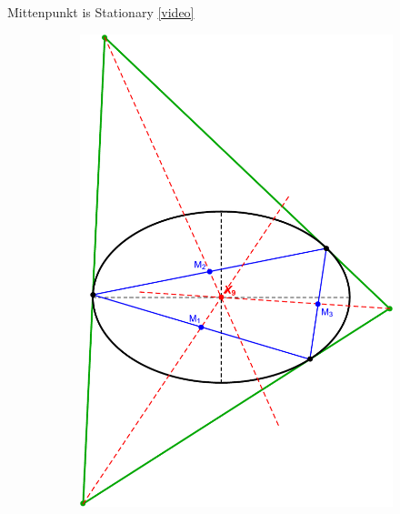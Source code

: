 \begin{frame}{Mittenpunkt is Stationary  \href{https://youtu.be/tMrBqfRBYik}{[video]}}
\begin{figure}
\centering
     \begin{subfigure}[t]{0.45\textwidth}
         \centering
         \includegraphics[height=.8\textheight]{pics/0052_mitten_rot.pdf}
     \end{subfigure}
     \hspace{-.5em}
     \begin{subfigure}[t]{0.45\textwidth}
         \centering

\end{subfigure}
\end{figure}
\end{frame}
